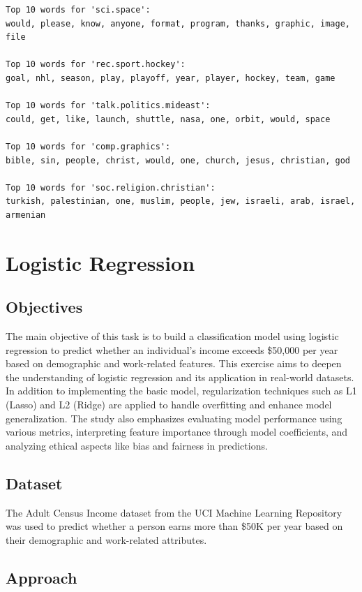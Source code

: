 \documentclass[a4paper,12pt]{article}
\begin{document}
\begin{verbatim}
Top 10 words for 'sci.space':
would, please, know, anyone, format, program, thanks, graphic, image, file

Top 10 words for 'rec.sport.hockey':
goal, nhl, season, play, playoff, year, player, hockey, team, game

Top 10 words for 'talk.politics.mideast':
could, get, like, launch, shuttle, nasa, one, orbit, would, space

Top 10 words for 'comp.graphics':
bible, sin, people, christ, would, one, church, jesus, christian, god

Top 10 words for 'soc.religion.christian':
turkish, palestinian, one, muslim, people, jew, israeli, arab, israel, armenian
\end{verbatim}

\newpage
\section{Logistic Regression}

\subsection{Objectives}
The main objective of this task is to build a classification model using logistic regression to predict whether an individual's income exceeds \$50,000 per year based on demographic and work-related features. This exercise aims to deepen the understanding of logistic regression and its application in real-world datasets. In addition to implementing the basic model, regularization techniques such as L1 (Lasso) and L2 (Ridge) are applied to handle overfitting and enhance model generalization. The study also emphasizes evaluating model performance using various metrics, interpreting feature importance through model coefficients, and analyzing ethical aspects like bias and fairness in predictions.

\subsection{Dataset}
The Adult Census Income dataset from the UCI Machine Learning Repository was used to predict whether a person earns more than \$50K per year based on their demographic and work-related attributes.


\subsection{Approach}
\end{document}
